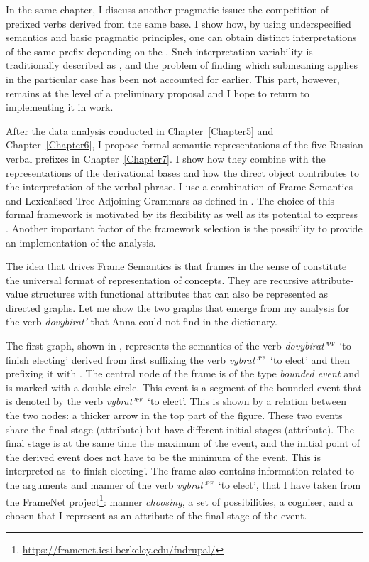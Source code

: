 In the same chapter, I discuss another pragmatic issue: the competition of prefixed verbs derived from the same base. I show how, by using underspecified semantics and basic pragmatic principles, one can obtain distinct interpretations of the same prefix depending on the . Such interpretation variability is traditionally described as , and the problem of finding which submeaning applies in the particular case has been not accounted for earlier. This part, however, remains at the level of a preliminary proposal and I hope to return to implementing it in  work.

After the data analysis conducted in Chapter~\ref{Chapter5} and Chapter~\ref{Chapter6}, I propose formal semantic representations of the five Russian verbal prefixes in Chapter~\ref{Chapter7}. I show how they combine with the representations of the derivational bases and how the direct object contributes to the interpretation of the verbal phrase. I use a combination of Frame Semantics and Lexicalised Tree Adjoining Grammars as defined in \citealt{KallmeyerOsswald:13}. The choice of this formal framework is motivated by its flexibility as well as its potential to express . Another important factor of the framework selection is the possibility to provide an implementation of the analysis. 

The idea that drives Frame Semantics \citep{Loebner:2014} is that frames in the sense of \citet{Barsalou:92} constitute the universal format of representation of concepts. They are recursive attribute-value structures with functional attributes that can also be represented as directed graphs. Let me show the two graphs that emerge from my analysis for the verb \textit{dovybirat'} that Anna could not find in the dictionary.

The first graph, shown in , represents the semantics of the verb \textit{dovybirat'}$^{\textsc{pf}}$ `to finish electing' derived from first suffixing the verb \textit{vybrat'}$^{\textsc{pf}}$ `to elect' and then prefixing it with . The central node of the frame is of the type \textit{bounded event} and is marked with a double circle. This event is a segment of the bounded event that is denoted by the verb \textit{vybrat'}$^{\textsc{pf}}$ `to elect'. This is shown by a relation between the two nodes: a thicker arrow in the top part of the figure. These two events share the final stage (\FIN attribute) but have different initial stages (\INIT attribute). The final stage is at the same time the maximum of the event, and the initial point of the derived event does not have to be the minimum of the event. This is interpreted as `to finish electing'. The frame also contains information related to the arguments and manner of the verb \textit{vybrat'}$^{\textsc{pf}}$ `to elect', that I have taken from the FrameNet project\footnote{\url{https://framenet.icsi.berkeley.edu/fndrupal/}}: manner \textit{choosing}, a set of possibilities, a cogniser, and a chosen that I represent as an attribute of the final stage of the event.

